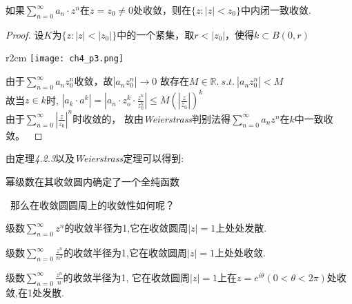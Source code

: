 \begin{theorem}
    如果$\displaystyle{\sum\limits_{n=0}^\infty a_n\cdot z^n}$在$z=z_0\neq0$处收敛，则在$\{z:|z|<z_0\}$中内闭一致收敛.
\end{theorem}
\begin{proof}
	设$K$为$\{z:|z|<|z_0|\}$中的一个紧集，取$r<|z_0|$，使得$k\subset B(0,r)$
\begin{wrapfigure}[4]{r}{2cm}
    \centering
    \texttt{[image: ch4\_p3.png]}
\end{wrapfigure}
由于$\displaystyle{\sum\limits_{n=0}^\infty a_nz_0^n}$收敛，故$\left|a_nz_0^n\right|\rightarrow0$
故存在$M\in\mathbb{R}.\ s.t.\ \left|a_nz_0^n\right|<M$\\
故当$z\in k$时,
$\displaystyle{\left|a_k\cdot a^k\right|=\left|a_n\cdot z_o^k\cdot \frac{z^k}{z_0^k}\right|\leqslant M\left(\left|\frac{z}{z_0}\right|\right)^k}$\\
由于$\displaystyle{\sum\limits_{n=0}^\infty\left|\frac{z}{z_0}\right|^n}$时收敛的，
故由\emph{Weierstrass}判别法得$\displaystyle{\sum\limits_{n=0}^\infty a_nz^n}$在$k$中一致收敛。\
\end{proof}

\noindent 由定理\emph{4.2.3}以及\emph{Weierstrass}定理可以得到:

\begin{theorem}
    幂级数在其收敛圆内确定了一个全纯函数\par
    \qquad\quad\, 那么在收敛圆圆周上的收敛性如何呢？
\end{theorem}

\begin{eg}
    级数$\displaystyle{\sum\limits_{n=0}^\infty z^n}$的收敛半径为1,它在收敛圆周$|z|=1$上处处发散.
\end{eg}

\begin{eg}
    级数$\displaystyle{\sum\limits_{n=0}^\infty \frac{z^n}{n^2}}$的收敛半径为1,它在收敛圆周$|z|=1$上处处收敛.
\end{eg}

\begin{eg}
    级数$\displaystyle{\sum\limits_{n=0}^\infty \frac{z^n}{n}}$的收敛半径为1,
    它在收敛圆周$|z|=1$上在$z=e^{i\theta}(0<\theta<2\pi)$处收敛,在1处发散.
\end{eg}

